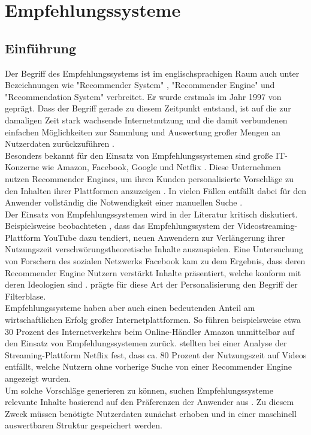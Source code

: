 \chapter{Empfehlungssysteme}
\label{ch:empfehlungssysteme}
\section{Einführung}
\label{ch:empfehlungssysteme:einfuehrung}
Der Begriff des Empfehlungssystems ist im englischsprachigen Raum auch unter Bezeichnungen wie "Recommender System" \cite[S. 1]{lu:2015}, "Recommender Engine" \cite[S. 1]{panigrahi:2016} und "Recommendation System" \cite[S. 1]{ebesu:2018} verbreitet. Er wurde erstmals im Jahr 1997 von \textcite[S. 1]{resnick:1997} geprägt. Dass der Begriff gerade zu diesem Zeitpunkt entstand, ist auf die zur damaligen Zeit stark wachsende Internetnutzung und die damit verbundenen einfachen Möglichkeiten zur Sammlung und Auswertung großer Mengen an Nutzerdaten zurückzuführen \cite[S. xvii]{recommenderSystems:2016}.\\
Besonders bekannt für den Einsatz von Empfehlungssystemen sind große IT-Konzerne wie Amazon, Facebook, Google und Netflix \cite[S. 1]{zarzour:2018}. Diese Unternehmen nutzen Recommender Engines, um ihren Kunden personalisierte Vorschläge zu den Inhalten ihrer Plattformen anzuzeigen \cite[S. 2]{jeckmans:2013}. In vielen Fällen entfällt dabei für den Anwender vollständig die Notwendigkeit einer manuellen Suche \cite[S. 1]{comibingCareer:2013}.\\
Der Einsatz von Empfehlungssystemen wird in der Literatur kritisch diskutiert. Beispielsweise beobachteten \textcite[S. 17f.]{alfano:2020}, dass das Empfehlungssystem der Videostreaming-Plattform YouTube dazu tendiert, neuen Anwendern zur Verlängerung ihrer Nutzungszeit verschwörungstheoretische Inhalte auszuspielen. Eine Untersuchung von Forschern des sozialen Netzwerks Facebook kam zu dem Ergebnis, dass deren Recommender Engine Nutzern verstärkt Inhalte präsentiert, welche konform mit deren Ideologien sind \cite[S. 2]{bakshy:2015}. \textcite[S. 1ff.]{pariser:2012} prägte für diese Art der Personalisierung den Begriff der Filterblase.\\
Empfehlungssysteme haben aber auch einen bedeutenden Anteil am wirtschaftlichen Erfolg großer Internetplattformen. So führen beispielsweise \textcite[S. 6f.]{sharma:2015} etwa 30 Prozent des Internetverkehrs beim Online-Händler Amazon unmittelbar auf den Einsatz von Empfehlungssystemen zurück. \textcite[S. 5]{gomezuribe:2016} stellten bei einer Analyse der Streaming-Plattform Netflix fest, dass ca. 80 Prozent der Nutzungszeit auf Videos entfällt, welche Nutzern ohne vorherige Suche von einer Recommender Engine angezeigt wurden.\\
Um solche Vorschläge generieren zu können, suchen Empfehlungssysteme relevante Inhalte basierend auf den Präferenzen der Anwender aus \cite[S. 1]{das:2017}. Zu diesem Zweck müssen benötigte Nutzerdaten zunächst erhoben und in einer maschinell auswertbaren Struktur gespeichert werden.

